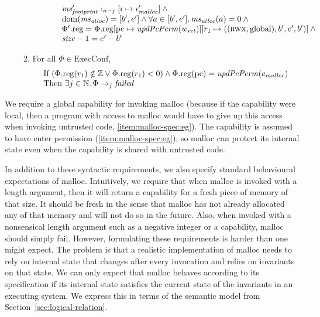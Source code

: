 \documentclass[format=acmsmall, review=true, screen=true]{acmart}
\renewcommand{\sectionname}{Section}
\newcommand{\update}[2]{[#1 \mapsto #2]}
\DeclareMathOperator{\dom}{dom}
\newcommand{\var}[1]{\mathit{#1}}
\newcommand{\hs}{\var{ms}}
\newcommand{\ms}{\hs}
\newcommand{\pcreg}{\mathrm{pc}}
\newcommand{\heap}{\var{mem}}
\newcommand{\size}{\var{size}}
\newcommand{\plainproj}[1]{\mathrm{#1}}
\newcommand{\memreg}[1][\Phi]{#1.\plainproj{reg}}
\newcommand{\failed}{\mathit{failed}}
\newcommand{\plainfun}[2]{
  \ifthenelse{\equal{#2}{}}
  {\mathit{#1}}
  {\mathit{#1}(#2)}
}
\newcommand{\updatePcPerm}[1]{\plainfun{updPcPerm}{#1}}
\newcommand{\heapSat}[3][\heap]{#1 :_{#2} #3}
\newcommand{\codelabel}[1]{\mathit{#1}}
\newcommand{\malloc}{\codelabel{malloc}}
\newcommand{\plaindom}[1]{\mathrm{#1}}
\newcommand{\ExecConfs}{\plaindom{ExecConf}}
\newcommand{\nats}{\mathbb{N}}
\newcommand{\ints}{\mathbb{Z}}
\newcommand{\plainperm}[1]{\textsc{#1}}
\newcommand{\rwx}{\plainperm{rwx}}
\newcommand{\plainlocality}[1]{\mathrm{#1}}
\newcommand{\glob}{\plainlocality{global}}
\newcommand{\step}[1][]{\rightarrow_{#1}}
\newenvironment{toplas}%
    {\color{OliveGreen}}{}
\begin{document}
\begin{toplas}
\begin{definition}
\begin{enumerate}
\begin{enumerate}
\[\begin{array}{l}
          \qquad \quad \heapSat[\ms_{\var{footprint}}']{n-j}{[i \mapsto \iota_\malloc']} \land{} \\
          \qquad \quad \dom(\hs_{\var{alloc}}) = [b',e'] \land \forall a \in [b',e']\ldotp \hs_{\var{alloc}}(a) = 0  \land{} \\
          \qquad \quad \memreg[\Phi'] = \memreg[\Phi]\update{\pcreg}{\updatePcPerm{w_{\var{ret}}}}\update{r_1}{((\rwx,\glob),b',e',b')} \land{} \\
          \qquad \quad \size - 1 = e'-b'
        \end{array}
      \]
    \item \label{item:malloc-spec:fail} For all $\Phi \in \ExecConfs$,
      \[
        \begin{array}{l}
          \text{If } (\memreg(r_1) \notin \ints \vee \memreg(r_1) < 0) \land
          \memreg(\pcreg) = \updatePcPerm{c_\malloc} \\
          \text{Then } \exists j \in \nats \ldotp \Phi \step[j] \failed
        \end{array}
      \]
    \end{enumerate}
  \end{enumerate}
\end{definition}


  We require a global capability for invoking malloc (because if the capability were local, then a program with access to malloc would have to give up this access when invoking untrusted code, \ref{item:malloc-spec:eg}).
  The capability is assumed to have enter permission (\ref{item:malloc-spec:eg}), so malloc can protect its internal state even when the capability is shared with untrusted code.

  In addition to these syntactic requirements, we also specify standard behavioural expectations of malloc.
  Intuitively, we require that when malloc is invoked with a length argument, then it will return a capability for a fresh piece of memory of that size.
  It should be fresh in the sense that malloc has not already allocated any of that memory and will not do so in the future.
  Also, when invoked with a nonsensical length argument such as a negative integer or a capability, malloc should simply fail.
  However, formulating these requirements is harder than one might expect.
  The problem is that a realistic implementation of malloc needs to rely on internal state that changes after every invocation and relies on invariants on that state.
  We can only expect that malloc behaves according to its specification if its internal state satisfies the current state of the invariants in an executing system.
  We express this in terms of the semantic model from \sectionname~\ref{sec:logical-relation}.


\end{toplas}
\end{document}
